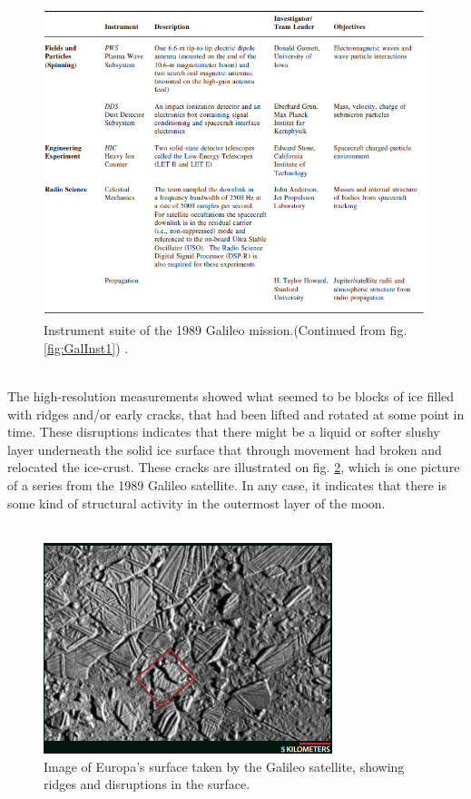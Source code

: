 \begin{figure}[htb]
	\centering
	\includegraphics[width=\textwidth]{figures/Rasmus/GalileoInstrument2}
	\caption{Instrument suite of the 1989 Galileo mission.(Continued from fig. \ref{fig:GalInst1}) \cite{SciStrat} .\label{fig:GalInst2}}
\end{figure}
\fi
\\
The high-resolution measurements showed what seemed to be blocks of ice filled with ridges and/or early cracks, that had been lifted and rotated at some point in time. These disruptions indicates that there might be a liquid or softer slushy layer underneath the solid ice surface that through movement had broken and relocated the ice-crust. These cracks are illustrated on fig. \ref{fig:SurfCrack}, which is one picture of a series from the 1989 Galileo satellite\cite{HidOcean}. In any case, it indicates that there is some kind of structural activity in the outermost layer of the moon.\\
\\

\begin{figure}[htb]
	\centering
	\includegraphics[width=0.75\textwidth]{figures/Rasmus/SurfCrack}
	\caption{Image of Europa's surface taken by the Galileo satellite, showing ridges and disruptions in the surface. \label{fig:SurfCrack}\cite{HidOcean}}
\end{figure}

